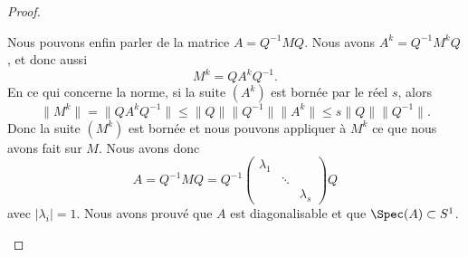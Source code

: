 \begin{proof}
\begin{subproof}
		\spitem[La matrice \( A\)]
		Nous pouvons enfin parler de la matrice \( A=Q^{-1}MQ\). Nous avons \( A^k=Q^{-1}M^kQ\), et donc aussi
		\begin{equation}
			M^k=QA^kQ^{-1}.
		\end{equation}
		En ce qui concerne la norme, si la suite \( (A^k)\) est bornée par le réel \( s\), alors
		\begin{equation}
			\| M^k \|=\| QA^kQ^{-1} \|\leq \| Q \|\| Q^{-1} \|\| A^k \|\leq s\| Q \|\| Q^{-1} \|.
		\end{equation}
		Donc la suite \( (M^k)\) est bornée et nous pouvons appliquer à \( M^k\) ce que nous avons fait sur \( M\). Nous avons donc
		\begin{equation}
			A=Q^{-1}MQ=Q^{-1}\begin{pmatrix}
				\lambda_1 &        &           \\
				          & \ddots &           \\
				          &        & \lambda_s
			\end{pmatrix}Q
		\end{equation}
		avec \( | \lambda_i |=1\). Nous avons prouvé que \( A\) est diagonalisable et que \( \Spec(A)\subset S^1\).
	\end{subproof}
\end{proof}
